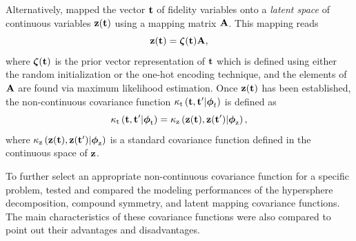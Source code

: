 \documentclass[iicol,sn-basic]{sn-jnl}%
\begin{document}
Alternatively, \cite{Oune2021} mapped the vector ${\bf t}$ of fidelity variables onto a \textit{latent space} of continuous variables ${\bf z}({\bf t})$ using a mapping matrix ${\bf A}$.
This mapping reads
\begin{equation}\label{Eq38}
	{\bf z}({\bf t}) = {\boldsymbol \zeta}({\bf t}) {\bf A},
\end{equation}
where ${\boldsymbol \zeta}({\bf t})$ is the prior vector representation of ${\bf t}$ which is defined using either the random initialization or the one-hot encoding technique, and the elements of ${\bf A}$ are found via maximum likelihood estimation.
Once ${\bf z}({\bf t})$ has been established, the non-continuous covariance function $\kappa_\text{t}\left({\bf t},{\bf t}'|{\boldsymbol \phi}_t\right)$ is defined as
\begin{equation}\label{Eq39}
	\kappa_\text{t}\left({\bf t},{\bf t}'|{\boldsymbol \phi}_\text{t}\right)=\kappa_\text{z}\left({\bf z}({\bf t}),{\bf z}({\bf t}')|{\boldsymbol \phi}_\text{z}\right),
\end{equation}
where $\kappa_\text{z}\left({\bf z}({\bf t}),{\bf z}({\bf t}')|{\boldsymbol \phi}_\text{z}\right)$ is a standard covariance function defined in the continuous space of ${\bf z}$.

To further select an appropriate non-continuous covariance function for a specific problem, \cite{Pelamatti2021} tested and compared the modeling performances of the hypersphere decomposition, compound symmetry, and latent mapping covariance functions.
The main characteristics of these covariance functions were also compared to point out their advantages and disadvantages.
\end{document}
